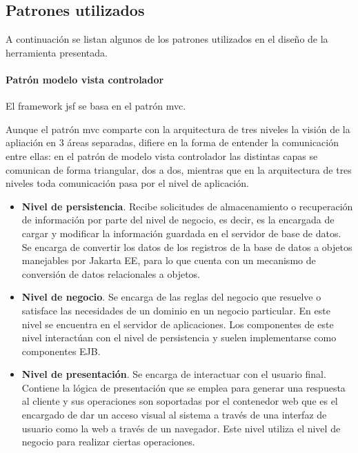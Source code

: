 \subsection{Patrones utilizados}
\label{sub:patrones}

A continuación se listan algunos de los patrones utilizados en el diseño de la herramienta presentada.



\paragraph{Patrón modelo vista controlador}
El framework \acrshort{jsf} se basa en el patrón \acrlong{mvc}.

Aunque el patrón \acrshort{mvc} comparte con la arquitectura de tres niveles la visión de la apliación en 3 áreas separadas, difiere en la forma de entender la comunicación entre ellas: en el patrón de modelo vista controlador las distintas capas se comunican de forma triangular, dos a dos, mientras que en la arquitectura de tres niveles toda comunicación pasa por el nivel de aplicación.
\begin{itemize}
\item \textbf{Nivel de persistencia}. Recibe solicitudes de almacenamiento o recuperación de información por parte del nivel de negocio, es decir, es la encargada de cargar y modificar la información guardada en el servidor de base de datos. Se encarga de convertir los datos de los registros de la base de datos a objetos manejables por Jakarta EE, para lo que cuenta con un mecanismo de conversión de datos relacionales a objetos. 
\item \textbf{Nivel de negocio}. Se encarga de las reglas del negocio que resuelve o satisface las necesidades de un dominio en un negocio particular. En este nivel se encuentra en el servidor de aplicaciones. Los componentes de este nivel interactúan con el nivel de persistencia y suelen implementarse como componentes EJB.
\item \textbf{Nivel de presentación}. Se encarga de interactuar con el usuario final. Contiene la lógica de presentación que se emplea para generar una respuesta al cliente y sus operaciones son soportadas por el contenedor web que es el encargado de dar un acceso visual al sistema a través de una interfaz de usuario como la web a través de un navegador. Este nivel utiliza el nivel de negocio para realizar ciertas operaciones.
\end{itemize}



